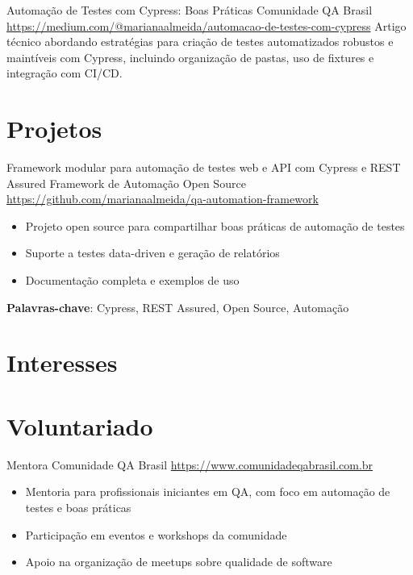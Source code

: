 \documentclass[a4paper, serif, 10pt]{moderncv}
\begin{document}
        {Automação de Testes com Cypress: Boas Práticas}
        {Comunidade QA Brasil}
        {\url{https://medium.com/@marianaalmeida/automacao-de-testes-com-cypress}}
        {}
        {Artigo técnico abordando estratégias para criação de testes automatizados robustos e maintíveis com Cypress, incluindo organização de pastas, uso de fixtures e integração com CI/CD.}
\section{Projetos}

        {Framework modular para automação de testes web e API com Cypress e REST Assured}
        {Framework de Automação Open Source}
        {\url{https://github.com/marianaalmeida/qa-automation-framework}}
        {}
        {\begin{itemize}
\item Projeto open source para compartilhar boas práticas de automação de testes
\item Suporte a testes data-driven e geração de relatórios
\item Documentação completa e exemplos de uso
\end{itemize}
\textbf{Palavras-chave}: Cypress, REST Assured, Open Source, Automação}
\section{Interesses}

\section{Voluntariado}

        {Mentora}
        {Comunidade QA Brasil}
        {\url{https://www.comunidadeqabrasil.com.br}}
        {}
        {\begin{itemize}
\item Mentoria para profissionais iniciantes em QA, com foco em automação de testes e boas práticas
\item Participação em eventos e workshops da comunidade
\item Apoio na organização de meetups sobre qualidade de software
\end{itemize}}
    
\end{document}
